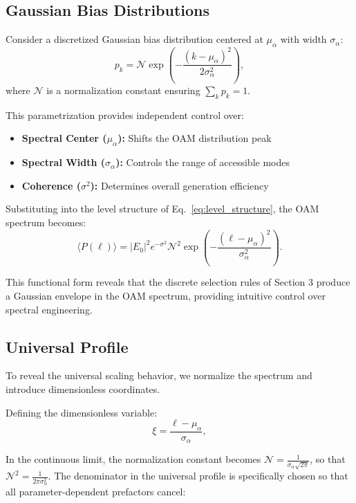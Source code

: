 \documentclass[a4paper,12pt]{article}
\newcommand{\ev}[1]{\langle #1 \rangle}
\begin{document}
\subsection{Gaussian Bias Distributions}

Consider a discretized Gaussian bias distribution centered at $\mu_\alpha$ with width $\sigma_\alpha$:
\begin{equation}
    p_k = \mathcal{N} \exp\left(-\frac{(k-\mu_\alpha)^2}{2\sigma_\alpha^2}\right),
    \label{eq:gaussian_bias}
\end{equation}
where $\mathcal{N}$ is a normalization constant ensuring $\sum_k p_k = 1$.

This parametrization provides independent control over:
\begin{itemize}
    \item \textbf{Spectral Center ($\mu_\alpha$):} Shifts the OAM distribution peak
    \item \textbf{Spectral Width ($\sigma_\alpha$):} Controls the range of accessible modes
    \item \textbf{Coherence ($\sigma^2$):} Determines overall generation efficiency
\end{itemize}

Substituting into the level structure of Eq.~\ref{eq:level_structure}, the OAM spectrum becomes:
\begin{equation}
    \ev{P(\ell)} = |E_0|^2 e^{-\sigma^2} \mathcal{N}^2 \exp\left(-\frac{(\ell-\mu_\alpha)^2}{\sigma_\alpha^2}\right).
    \label{eq:gaussian_spectrum}
\end{equation}

This functional form reveals that the discrete selection rules of Section 3 produce a Gaussian envelope in the OAM spectrum, providing intuitive control over spectral engineering.

\subsection{Universal Profile}
To reveal the universal scaling behavior, we normalize the spectrum and introduce dimensionless coordinates.

Defining the dimensionless variable:
\begin{equation}
    \xi = \frac{\ell - \mu_\alpha}{\sigma_\alpha},
    \label{eq:dimensionless_var}
\end{equation}

In the continuous limit, the normalization constant becomes $\mathcal{N} = \frac{1}{\sigma_\alpha\sqrt{2\pi}}$, so 
that $\mathcal{N}^2 = \frac{1}{2\pi\sigma_\alpha^2}$. The denominator in the universal profile is specifically chosen 
so that all parameter-dependent prefactors cancel:
\end{document}
